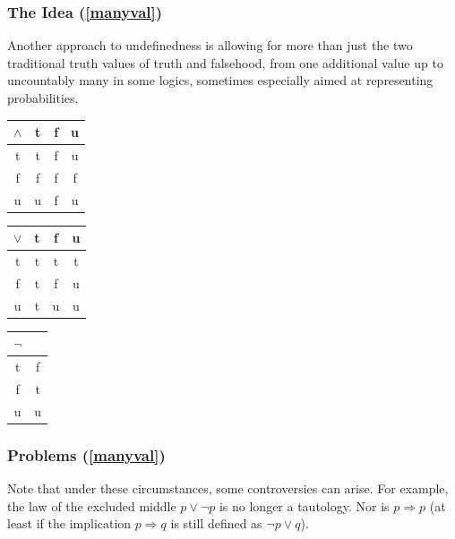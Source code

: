 \documentclass[aspectratio=169, usenames, dvipsnames]{beamer}
\begin{document}
\begin{frame}
\frametitle{The Idea (\ref{manyval})}
Another approach to undefinedness is allowing for more than just the two traditional truth values of truth and falsehood, from one additional value up to uncountably many in some logics, sometimes especially aimed at representing probabilities. 
\bigskip\bigskip

\begin{minipage}[t]{0.35\textwidth}
\begin{center}
\begin{tabular}{c|ccc}
$\wedge$ & t & f & u\\
\hline
t & t & f & u\\
f & f & f & f \\
u & u & f & u
\end{tabular}
\end{center}
\end{minipage}
\begin{minipage}[t]{0.35\textwidth}
\begin{center}
\begin{tabular}{c|ccc}
$\vee$ & t & f & u\\
\hline
t & t & t & t\\
f & t & f & u\\
u & t & u & u
\end{tabular}
\end{center}
\end{minipage}
\begin{minipage}[t]{0.2\textwidth}
\begin{center}
\begin{tabular}{c|c}
$\neg$ &\\
\hline
t & f\\
f & t \\
u & u
\end{tabular}
\end{center}
\end{minipage}
\end{frame}

\begin{frame}
\frametitle{Problems (\ref{manyval})}
Note that under these circumstances, some controversies can arise. For example, the law of the excluded middle $p \vee \neg p$ is no longer a tautology. Nor is $p \Rightarrow p$ (at least if the implication $p \Rightarrow q$ is still defined as $\neg p \vee q$).
\end{frame}

\end{document}
